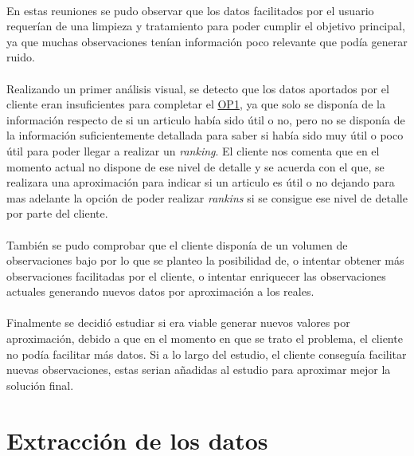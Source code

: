 \documentclass[10pt,a4paper,oneside]{book}
\begin{document}
\paragraph{}
En estas reuniones se pudo observar que los datos facilitados por el usuario requerían de una limpieza y tratamiento para poder cumplir el objetivo principal, ya que muchas observaciones tenían información poco relevante que podía generar ruido.

\paragraph{}
Realizando un primer análisis visual, se detecto que los datos aportados por el cliente eran insuficientes para completar el \hyperref[op:OP1]{OP1}, ya que solo se disponía de la información respecto de si un articulo había sido útil o no, pero no se disponía de la información suficientemente detallada para saber si había sido muy útil o poco útil para poder llegar a realizar un \textit{ranking}. El cliente nos comenta que en el momento actual no dispone de ese nivel de detalle y se acuerda con el que, se realizara una aproximación para indicar si un articulo es útil o no dejando para mas adelante la opción de poder realizar \textit{rankins} si se consigue ese nivel de detalle por parte del cliente.

\paragraph{}
También se pudo comprobar que el cliente disponía de un volumen de observaciones bajo por lo que se planteo la posibilidad de, o intentar obtener más observaciones facilitadas por el cliente, o intentar enriquecer las observaciones actuales generando nuevos datos por aproximación a los reales.

\paragraph{}
Finalmente se decidió estudiar si era viable generar nuevos valores por aproximación, debido a que en el momento en que se trato el problema, el cliente no podía facilitar más datos. Si a lo largo del estudio, el cliente conseguía facilitar nuevas observaciones, estas serian añadidas al estudio para aproximar mejor la solución final.

\section{Extracción de los datos}
\end{document}
